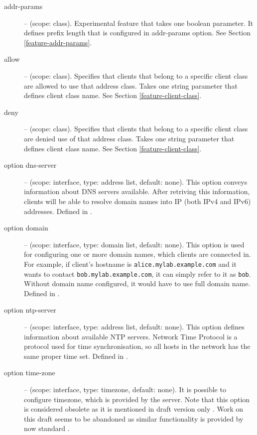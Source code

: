\begin{description}
\item[addr-params] -- (scope: class). Experimental feature that takes
  one boolean parameter. It defines prefix length that is configured
  in addr-params option. See Section \ref{feature-addr-params}.

\item[allow] -- (scope: class). Specifies that clients that belong to
  a specific client class are allowed to use that address class. Takes
  one string parameter that defines client class name. See Section
  \ref{feature-client-class}.

\item[deny] -- (scope: class). Specifies that clients that belong to
  a specific client class are denied use of that address class. Takes
  one string parameter that defines client class name. See Section
  \ref{feature-client-class}.

 \item[option dns-server] -- (scope: interface, type: address list, default:
   none). This option conveys information about DNS servers
   available. After retriving this information, clients will be able
   to resolve domain names into IP (both IPv4 and IPv6)
   addresses. Defined in \cite{rfc3596}.

 \item[option domain] -- (scope: interface, type: domain list, default:
   none). This option is used for configuring one or more domain
   names, which clients are connected in. For example, if client's
   hostname is \verb+alice.mylab.example.com+ and it wants to contact
   \verb+bob.mylab.example.com+, it can simply refer to it as
   \verb+bob+. Without domain name configured, it would have to use
   full domain name. Defined in \cite{rfc3596}.

 \item[option ntp-server] -- (scope: interface, type: address list, default:
   none). This option defines information about available NTP
   servers. Network Time Protocol \cite{rfc2030} is a protocol used
   for time synchronisation, so all hosts in the network has the same
   proper time set. Defined in \cite{rfc4075}.

 \item[option time-zone] -- (scope: interface, type: timezone, default:
   none). It is possible to configure timezone, which is provided by
   the server. Note that this option is considered obsolete as it is
   mentioned in draft version only \cite{draft-timezone}. Work on this
   draft seems to be abandoned as similar functionality is provided by
   now standard \cite{rfc4075}.


\end{description}
